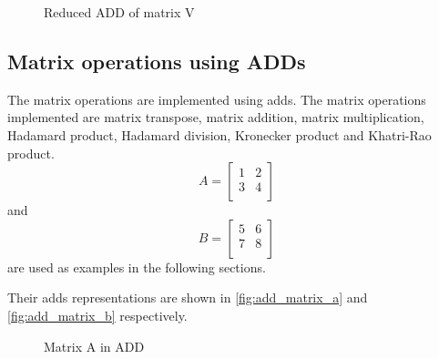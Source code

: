 \begin{figure}
    \centering
    
    \caption{Reduced ADD of matrix V}
    \label{fig:add_reduced}
\end{figure}

\subsection{Matrix operations using ADDs}
The matrix operations are implemented using \glspl{add}.
The matrix operations implemented are matrix transpose, matrix addition, matrix multiplication, Hadamard product, Hadamard division, Kronecker product and Khatri-Rao product. 
\[
A = \begin{bmatrix}
    1 & 2 \\
    3 & 4 \\
\end{bmatrix}
\]
and 
\[
B = \begin{bmatrix}
    5 & 6 \\
    7 & 8 \\
\end{bmatrix}
\]
are used as examples in the following sections.

Their \glspl{add} representations are shown in \autoref{fig:add_matrix_a} and \autoref{fig:add_matrix_b} respectively.

\begin{figure}
    \centering
    \caption{Matrix A in ADD}
    \label{fig:add_matrix_a}
\end{figure}

